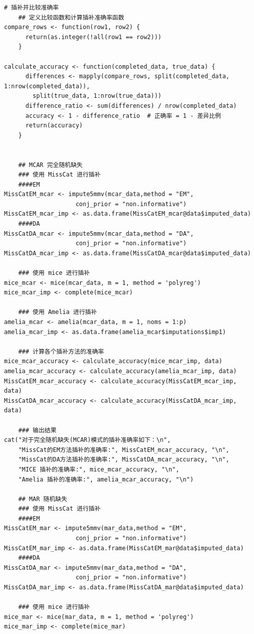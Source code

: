 \documentclass[12pt,hyperref,a4paper,UTF8]{ctexart}
\begin{document}
\begin{lstlisting}[style=R, title=testMissCat.R]
    # 插补并比较准确率
    ## 定义比较函数和计算插补准确率函数
compare_rows <- function(row1, row2) {
      return(as.integer(!all(row1 == row2)))
    }
    
calculate_accuracy <- function(completed_data, true_data) {
      differences <- mapply(compare_rows, split(completed_data, 1:nrow(completed_data)), 
        split(true_data, 1:nrow(true_data)))
      difference_ratio <- sum(differences) / nrow(completed_data)
      accuracy <- 1 - difference_ratio  # 正确率 = 1 - 差异比例
      return(accuracy)
    }
    
    
    ## MCAR 完全随机缺失
    ### 使用 MissCat 进行插补
    ####EM
MissCatEM_mcar <- impute5mmv(mcar_data,method = "EM",
                    conj_prior = "non.informative")
MissCatEM_mcar_imp <- as.data.frame(MissCatEM_mcar@data$imputed_data)
    ####DA
MissCatDA_mcar <- impute5mmv(mcar_data,method = "DA",
                    conj_prior = "non.informative")
MissCatDA_mcar_imp <- as.data.frame(MissCatDA_mcar@data$imputed_data)
    
    ### 使用 mice 进行插补
mice_mcar <- mice(mcar_data, m = 1, method = 'polyreg')
mice_mcar_imp <- complete(mice_mcar)
    
    ### 使用 Amelia 进行插补
amelia_mcar <- amelia(mcar_data, m = 1, noms = 1:p)
amelia_mcar_imp <- as.data.frame(amelia_mcar$imputations$imp1)
    
    ### 计算各个插补方法的准确率
mice_mcar_accuracy <- calculate_accuracy(mice_mcar_imp, data)
amelia_mcar_accuracy <- calculate_accuracy(amelia_mcar_imp, data)
MissCatEM_mcar_accuracy <- calculate_accuracy(MissCatEM_mcar_imp, data)
MissCatDA_mcar_accuracy <- calculate_accuracy(MissCatDA_mcar_imp, data)
    
    ### 输出结果
cat("对于完全随机缺失(MCAR)模式的插补准确率如下：\n",
    "MissCat的EM方法插补的准确率:", MissCatEM_mcar_accuracy, "\n",
    "MissCat的DA方法插补的准确率:", MissCatDA_mcar_accuracy, "\n",
    "MICE 插补的准确率:", mice_mcar_accuracy, "\n",
    "Amelia 插补的准确率:", amelia_mcar_accuracy, "\n")
    
    ## MAR 随机缺失
    ### 使用 MissCat 进行插补
    ####EM
MissCatEM_mar <- impute5mmv(mar_data,method = "EM",
                    conj_prior = "non.informative")
MissCatEM_mar_imp <- as.data.frame(MissCatEM_mar@data$imputed_data)
    ####DA
MissCatDA_mar <- impute5mmv(mar_data,method = "DA",
                    conj_prior = "non.informative")
MissCatDA_mar_imp <- as.data.frame(MissCatDA_mar@data$imputed_data)
    
    ### 使用 mice 进行插补
mice_mar <- mice(mar_data, m = 1, method = 'polyreg')
mice_mar_imp <- complete(mice_mar)
    

\end{lstlisting}
\end{document}
